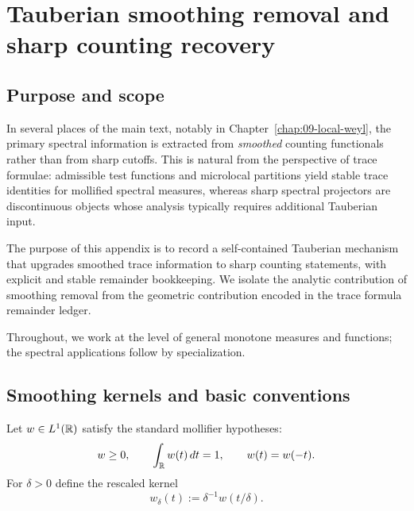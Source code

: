 
\appendix
\chapter{Tauberian smoothing removal and sharp counting recovery}
\label{app:D-tauberian}

\section{Purpose and scope}
\label{sec:D.purpose}

In several places of the main text, notably in Chapter~\ref{chap:09-local-weyl}, the primary spectral information is
extracted from \emph{smoothed} counting functionals rather than from sharp cutoffs.
This is natural from the perspective of trace formulae: admissible test functions and microlocal partitions yield
stable trace identities for mollified spectral measures, whereas sharp spectral projectors are discontinuous objects
whose analysis typically requires additional Tauberian input.

The purpose of this appendix is to record a self-contained Tauberian mechanism that upgrades smoothed trace
information to sharp counting statements, with explicit and stable remainder bookkeeping.
We isolate the analytic contribution of smoothing removal from the geometric contribution encoded in the trace
formula remainder ledger.

Throughout, we work at the level of general monotone measures and functions; the spectral applications follow by
specialization.

\section{Smoothing kernels and basic conventions}
\label{sec:D.kernels}

Let $w\in L^1(\mathbb{R})$ satisfy the standard mollifier hypotheses:
\begin{equation}
\label{eq:D.mollifier.assumptions}
w\ge 0,
\qquad
\int_{\mathbb{R}} w(t)\,dt = 1,
\qquad
w(t)=w(-t).
\end{equation}
For $\delta>0$ define the rescaled kernel
\begin{equation}
\label{eq:D.wdelta}
w_\delta(t):=\delta^{-1}w(t/\delta).
\end{equation}

